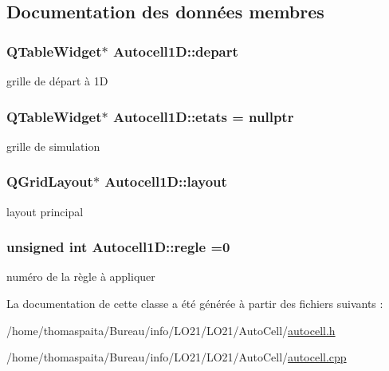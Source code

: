 \subsection{Documentation des données membres}
\subsubsection[{\texorpdfstring{depart}{depart}}]{\setlength{\rightskip}{0pt plus 5cm}Q\+Table\+Widget$\ast$ Autocell1\+D\+::depart\hspace{0.3cm}{\ttfamily [protected]}}\hypertarget{class_autocell1_d_a7bd65a39691f86e179bcb0466e7e38c2}{}\label{class_autocell1_d_a7bd65a39691f86e179bcb0466e7e38c2}
grille de départ à 1D 
\subsubsection[{\texorpdfstring{etats}{etats}}]{\setlength{\rightskip}{0pt plus 5cm}Q\+Table\+Widget$\ast$ Autocell1\+D\+::etats = nullptr\hspace{0.3cm}{\ttfamily [protected]}}\hypertarget{class_autocell1_d_aed4038c48d9cc0a841e6f565d4cd792c}{}\label{class_autocell1_d_aed4038c48d9cc0a841e6f565d4cd792c}
grille de simulation 
\subsubsection[{\texorpdfstring{layout}{layout}}]{\setlength{\rightskip}{0pt plus 5cm}Q\+Grid\+Layout$\ast$ Autocell1\+D\+::layout\hspace{0.3cm}{\ttfamily [protected]}}\hypertarget{class_autocell1_d_a7934db954892dc0efc12a961686a75c0}{}\label{class_autocell1_d_a7934db954892dc0efc12a961686a75c0}
layout principal 
\subsubsection[{\texorpdfstring{regle}{regle}}]{\setlength{\rightskip}{0pt plus 5cm}unsigned int Autocell1\+D\+::regle =0\hspace{0.3cm}{\ttfamily [protected]}}\hypertarget{class_autocell1_d_ae28c4a70102bd5e08a2414d27b20bb47}{}\label{class_autocell1_d_ae28c4a70102bd5e08a2414d27b20bb47}
numéro de la règle à appliquer 

La documentation de cette classe a été générée à partir des fichiers suivants \+:\begin{DoxyCompactItemize}
\item 
/home/thomaspaita/\+Bureau/info/\+L\+O21/\+L\+O21/\+Auto\+Cell/\hyperlink{autocell_8h}{autocell.\+h}\item 
/home/thomaspaita/\+Bureau/info/\+L\+O21/\+L\+O21/\+Auto\+Cell/\hyperlink{autocell_8cpp}{autocell.\+cpp}\end{DoxyCompactItemize}
